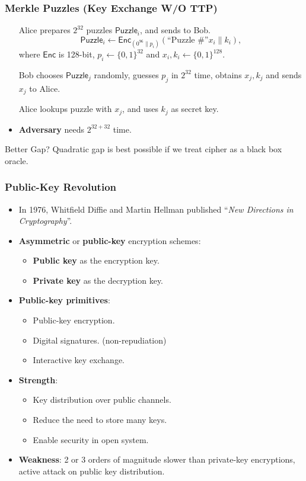 \begin{frame}\frametitle{Merkle Puzzles (Key Exchange W/O TTP)}
\begin{itemize}
\item[Alice] prepares $2^{32}$ puzzles $\mathsf{Puzzle}_i$, and sends to Bob.\\
\[\mathsf{Puzzle}_i \gets \mathsf{Enc}_{(0^{96}\|p_i)}(\text{``Puzzle \#''} x_i  \| k_i),\]
where $\mathsf{Enc}$ is 128-bit, $p_i \gets \{0,1\}^{32}$ and $x_i,k_i \gets \{0,1\}^{128}$.
\item[Bob] chooses $\mathsf{Puzzle}_j$ randomly, guesses $p_j$ in $2^{32}$ time, obtains $x_j,k_j$ and sends $x_j$ to Alice.
\item[Alice] lookups puzzle with $x_j$, and uses $k_j$ as secret key.
\item \textbf{Adversary} needs $2^{32+32}$ time.
\end{itemize}
\begin{block}{Better Gap?}
Quadratic gap is best possible if we treat cipher as a black box oracle.
\end{block}
\end{frame}
\begin{frame}\frametitle{Public-Key Revolution}
\begin{itemize}
\item In 1976, Whitfield Diffie and Martin Hellman published ``\emph{New Directions in Cryptography}''.
\item \textbf{Asymmetric} or \textbf{public-key} encryption schemes:
\begin{itemize}
\item \textbf{Public key} as the encryption key.
\item \textbf{Private key} as the decryption key.
\end{itemize}
\item \textbf{Public-key primitives}:
\begin{itemize}
\item Public-key encryption.
\item Digital signatures. (non-repudiation)
\item Interactive key exchange.
\end{itemize}
\item \textbf{Strength}:
\begin{itemize}
\item Key distribution over public channels.
\item Reduce the need to store many keys.
\item Enable security in open system.
\end{itemize}
\item \textbf{Weakness}: 2 or 3 orders of magnitude slower than private-key encryptions, active attack on public key distribution.
\end{itemize}
\end{frame}
